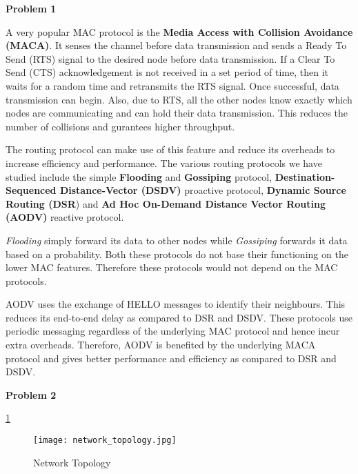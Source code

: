 \documentclass[fleqn, letterpaper, 11.8pt]{article}
\begin{document}
\pagetitle %
\bigskip
\textbf{Problem 1}

A very popular MAC protocol is the \textbf{Media Access with Collision Avoidance (MACA)}. It senses the channel before data transmission and sends a Ready To Send (RTS) signal to the desired node before data transmission. If a Clear To Send (CTS) acknowledgement is not received in a set period of time, then it waits for a random time and retransmits the RTS signal. Once successful, data transmission can begin. Also, due to RTS, all the other nodes know exactly which nodes are communicating and can hold their data transmission. This reduces the number of collisions and gurantees higher throughput. 

The routing protocol can make use of this feature and reduce its overheads to increase efficiency and performance. The various routing protocols we have studied include the simple \textbf{Flooding} and \textbf{Gossiping} protocol, \textbf{Destination-Sequenced Distance-Vector (DSDV)} proactive protocol, \textbf{Dynamic Source Routing (DSR}) and \textbf{Ad Hoc On-Demand Distance Vector Routing (AODV)} reactive protocol. 

\textit{Flooding} simply forward its data to other nodes while \textit{Gossiping} forwards it data based on a probability. Both these protocols do not base their functioning on the lower MAC features. Therefore these protocols would not depend on the MAC protocols.

AODV uses the exchange of HELLO messages to identify their neighbours. This reduces its end-to-end delay as compared to DSR and DSDV. These protocols use periodic messaging regardless of the underlying MAC protocol and hence incur extra overheads. Therefore, AODV is benefited by the underlying MACA protocol and gives better performance and efficiency as compared to DSR and DSDV.

\bigskip
\textbf{Problem 2}



\ref{nw_top}
\begin{figure}[hbtp]
\begin{center}
\texttt{[image: network\_topology.jpg]}
\caption{Network Topology}
\label{nw_top}
\end{center}
\end{figure}

%
%

\end{document}
